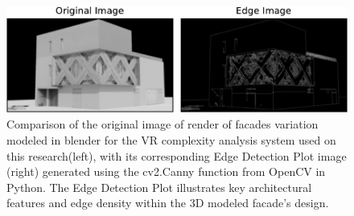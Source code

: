      \begin{figure}[htb]
          \centering
          \includegraphics[width= \linewidth]{Images/CannyEdgePlotRender}
          \caption{Comparison of the original image of render of facades variation modeled in blender for the VR complexity analysis system used on this research(left), with its corresponding Edge Detection Plot image (right) generated using the cv2.Canny function from OpenCV in Python. The Edge Detection Plot illustrates key architectural features and edge density within the 3D modeled facade's design.}
          \label{fig:CannyEdgePlotRender}
        \end{figure}


